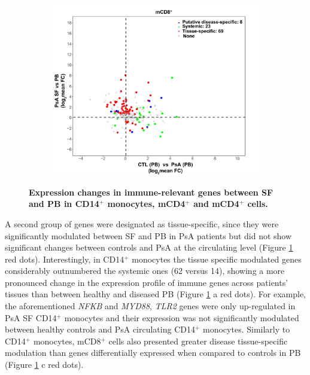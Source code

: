 \begin{figure}[htbp]
\begin{subfigure}{0.6\textwidth}
\caption{\textbf{}}
\end{subfigure} %
\begin{subfigure}{0.6\textwidth}
\centering
\includegraphics[width=\textwidth]{./Results3/pdfs/PSA_array_correlation_CD8_FC_HVPsA_vs_SFPBPsA}
\caption{\textbf{}}
\end{subfigure}
\caption[Expression changes in immune-relevant genes between SF and PB in CD14$^+$ monocytes, mCD4$^+$ and mCD4$^+$ cells.]{\textbf{Expression changes in immune-relevant genes between SF and PB in CD14$^+$ monocytes, mCD4$^+$ and mCD4$^+$ cells.}}
\label{figure:PSA_PCR_array_HC_FC_correlation}
\end{figure} 

A second group of genes were designated as tissue-specific, since they were significantly modulated between SF and PB in PsA patients but did not show significant changes between controls and PsA at the circulating level (Figure \ref{figure:PSA_PCR_array_HC_FC_correlation} red dots). Interestingly, in CD14$^+$ monocytes the tissue specific modulated genes considerably outnumbered the systemic ones (62 versus 14), showing a more pronounced change in the expression profile of immune genes across patients' tissues than between healthy and diseased PB (Figure \ref{figure:PSA_PCR_array_HC_FC_correlation} a red dots). For example, the aforementioned \textit{NFKB} and \textit{MYD88}, \textit{TLR2} genes were only up-regulated in PsA SF CD14$^+$ monocytes and their expression was not significantly modulated between healthy controls and PsA circulating CD14$^+$ monocytes.  Similarly to CD14$^+$ monocytes, mCD8$^+$ cells also presented greater disease tissue-specific modulation than genes differentially expressed when compared to controls in PB (Figure \ref{figure:PSA_PCR_array_HC_FC_correlation} c red dots).  

